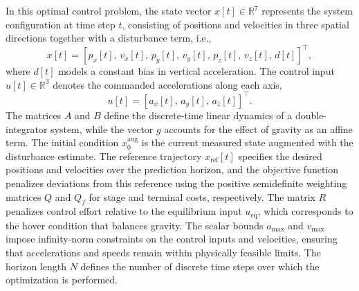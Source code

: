 \documentclass[12pt,a4paper]{article}
\begin{document}
In this optimal control problem, the state vector $x[t]\in\mathbb{R}^7$ represents the system configuration at time step $t$, consisting of positions and velocities in three spatial directions together with a disturbance term, i.e.,
\[
x[t]=[p_x[t],\,v_x[t],\,p_y[t],\,v_y[t],\,p_z[t],\,v_z[t],\,d[t]]^\top,
\]
where $d[t]$ models a constant bias in vertical acceleration. The control input $u[t]\in\mathbb{R}^3$ denotes the commanded accelerations along each axis,
\[
u[t]=[a_x[t],\,a_y[t],\,a_z[t]]^\top.
\]
The matrices $A$ and $B$ define the discrete-time linear dynamics of a double-integrator system, while the vector $g$ accounts for the effect of gravity as an affine term. The initial condition $x_0^{\mathrm{aug}}$ is the current measured state augmented with the disturbance estimate. The reference trajectory $x_{\mathrm{ref}}[t]$ specifies the desired positions and velocities over the prediction horizon, and the objective function penalizes deviations from this reference using the positive semidefinite weighting matrices $Q$ and $Q_f$ for stage and terminal costs, respectively. The matrix $R$ penalizes control effort relative to the equilibrium input $u_{\mathrm{eq}}$, which corresponds to the hover condition that balances gravity. The scalar bounds $a_{\max}$ and $v_{\max}$ impose infinity-norm constraints on the control inputs and velocities, ensuring that accelerations and speeds remain within physically feasible limits. The horizon length $N$ defines the number of discrete time steps over which the optimization is performed.
\end{document}
